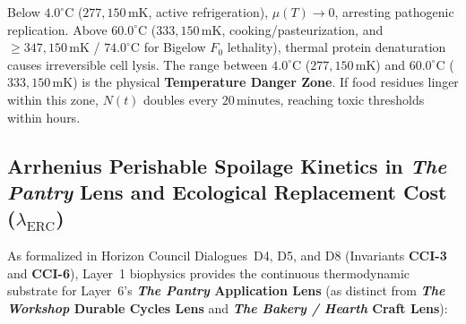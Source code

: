 Below $4.0^\circ\mathrm{C}$ ($277{,}150\,\mathrm{mK}$, active refrigeration), $\mu(T) \to 0$, arresting pathogenic replication. Above $60.0^\circ\mathrm{C}$ ($333{,}150\,\mathrm{mK}$, cooking/pasteurization, and $\ge 347{,}150\,\mathrm{mK}$ / $74.0^\circ\mathrm{C}$ for Bigelow $F_0$ lethality), thermal protein denaturation causes irreversible cell lysis. The range between $4.0^\circ\mathrm{C}$ ($277{,}150\,\mathrm{mK}$) and $60.0^\circ\mathrm{C}$ ($333{,}150\,\mathrm{mK}$) is the physical \textbf{Temperature Danger Zone}. If food residues linger within this zone, $N(t)$ doubles every $20\,\mathrm{minutes}$, reaching toxic thresholds within hours.

\subsection{Arrhenius Perishable Spoilage Kinetics in \textit{The Pantry} Lens and Ecological Replacement Cost \texorpdfstring{($\lambda_{\mathrm{ERC}}$)}{(lambda\_ERC)}}
\label{subsec:bio_pantry_arrhenius_erc}
As formalized in Horizon Council Dialogues~D4, D5, and D8 (Invariants \textbf{CCI-3} and \textbf{CCI-6}), Layer~1 biophysics provides the continuous thermodynamic substrate for Layer~6's \textbf{\textit{The Pantry} Application Lens} (as distinct from \textbf{\textit{The Workshop} Durable Cycles Lens} and \textbf{\textit{The Bakery / Hearth} Craft Lens}):
